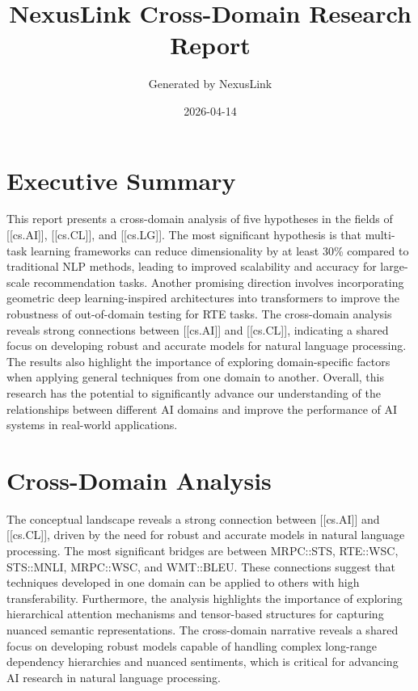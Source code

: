 \documentclass[12pt,a4paper]{article}
\title{NexusLink Cross-Domain Research Report}
\author{Generated by NexusLink}
\date{2026-04-14}
\begin{document}
\maketitle
\tableofcontents
\newpage

\section{Executive Summary}

This report presents a cross-domain analysis of five hypotheses in the fields of [[cs.AI]], [[cs.CL]], and [[cs.LG]]. The most significant hypothesis is that multi-task learning frameworks can reduce dimensionality by at least 30\% compared to traditional NLP methods, leading to improved scalability and accuracy for large-scale recommendation tasks. Another promising direction involves incorporating geometric deep learning-inspired architectures into transformers to improve the robustness of out-of-domain testing for RTE tasks. The cross-domain analysis reveals strong connections between [[cs.AI]] and [[cs.CL]], indicating a shared focus on developing robust and accurate models for natural language processing. The results also highlight the importance of exploring domain-specific factors when applying general techniques from one domain to another. Overall, this research has the potential to significantly advance our understanding of the relationships between different AI domains and improve the performance of AI systems in real-world applications.

\section{Cross-Domain Analysis}

The conceptual landscape reveals a strong connection between [[cs.AI]] and [[cs.CL]], driven by the need for robust and accurate models in natural language processing. The most significant bridges are between MRPC::STS, RTE::WSC, STS::MNLI, MRPC::WSC, and WMT::BLEU. These connections suggest that techniques developed in one domain can be applied to others with high transferability. Furthermore, the analysis highlights the importance of exploring hierarchical attention mechanisms and tensor-based structures for capturing nuanced semantic representations. The cross-domain narrative reveals a shared focus on developing robust models capable of handling complex long-range dependency hierarchies and nuanced sentiments, which is critical for advancing AI research in natural language processing.
\end{document}
